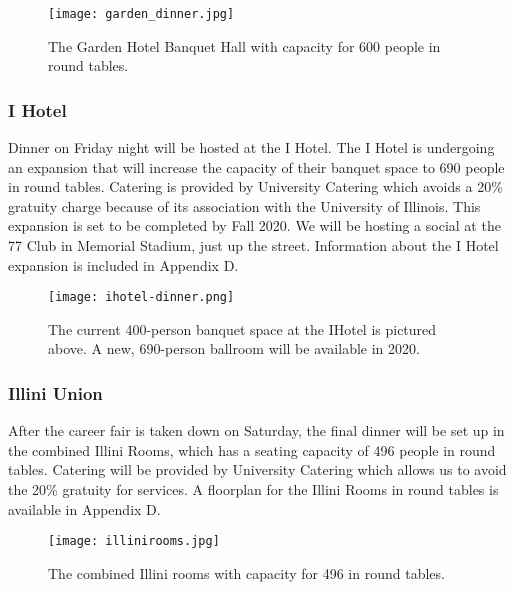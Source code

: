 \begin{figure}[H]
    \centering
    \texttt{[image: garden\_dinner.jpg]}
    \caption{The Garden Hotel Banquet Hall with capacity for 600 people in round tables.}
\end{figure}

\subsubsection{I Hotel}
Dinner on Friday night will be hosted at the I Hotel. The I Hotel is undergoing an expansion that will increase the capacity of their banquet space to 690 people in round tables. Catering is provided by University Catering which avoids a 20\% gratuity charge because of its association with the University of Illinois. This expansion is set to be completed by Fall 2020. We will be hosting a social at the 77 Club in Memorial Stadium, just up the street. Information about the I Hotel expansion is included in Appendix D.

\begin{figure}[H]
    \centering
    \texttt{[image: ihotel-dinner.png]}
    \caption{The current 400-person banquet space at the IHotel is pictured 
        above. A new, 690-person ballroom will be available in 2020.}
\end{figure}

\subsubsection{Illini Union}
After the career fair is taken down on Saturday, the final dinner will be set up in the combined Illini Rooms, which has a seating capacity of 496 people in round tables. Catering will be provided by University Catering which allows us to avoid the 20\% gratuity for services. A floorplan for the Illini Rooms in round tables is available in Appendix D.\\

\begin{figure}[H]
    \centering
    \texttt{[image: illinirooms.jpg]}
    \caption{The combined Illini rooms with capacity for 496 in round tables.}
\end{figure}


